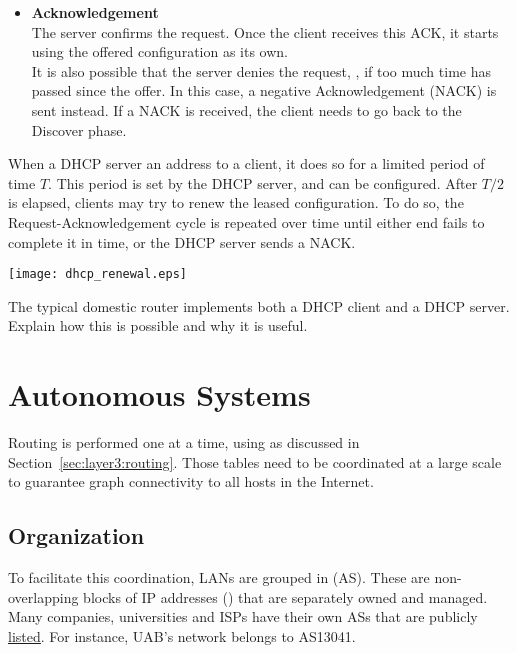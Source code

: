 \begin{itemize}
\vspace{0.25cm}
\item \textbf{Acknowledgement}\\
The server confirms the request. Once the client receives this ACK,
it starts using the offered configuration as its own. \\[-0.3cm]

It is also possible that the server denies the request, \eg, if 
too much time has passed since the offer. In this case, 
a negative Acknowledgement (NACK) is sent instead. If a NACK is received,
the client needs to go back to the Discover phase.
\end{itemize}

When a DHCP server  an address to a client, it does 
so for a limited period of time $T$. This period is set by the DHCP server, and can be configured.
After $T/2$ is elapsed, clients may try to renew the leased configuration. To do so,
the Request-Acknowledgement cycle is repeated over time until either end fails to complete it in time,
or the DHCP server sends a NACK.

\begin{center}
\texttt{[image: dhcp\_renewal.eps]}
\end{center}

\begin{exercise}
The typical domestic router implements both a DHCP client and a DHCP server.
Explain how this is possible and why it is useful.
\end{exercise}


\section{Autonomous Systems}

Routing is performed one  at a time, using  
as discussed in Section~\ref{sec:layer3:routing}. Those tables need to be coordinated at a large 
scale to guarantee graph connectivity to all hosts in the Internet.


\subsection{Organization}

To facilitate this coordination, LANs are grouped in  (AS).
These are non-overlapping blocks of IP addresses () that are separately owned and managed.
Many companies, universities and ISPs have their own ASs that are publicly 
\href{https://2ip.io/analytics/asn-list/}{\underline{listed}}. For instance, UAB's network belongs to
AS13041.

